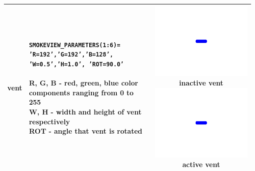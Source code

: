 \begin{longtable}[ht]{|l|l|c|}
vent&
\parbox[c]{\boxwidth}{
{\tt SMOKEVIEW\_PARAMETERS(1:6)=}\\
{\tt 'R=192','G=192','B=128',}\\
{\tt 'W=0.5','H=1.0', 'ROT=90.0'}\\ \\
R, G, B - red, green, blue color components ranging from 0 to 255\\
W, H - width and height of vent respectively\\
ROT - angle that vent is rotated
} &
\parbox[c]{\devicewidth}{
\vspace{0.01in}
\includegraphics[width=\devicewidth]{SCRIPT_FIGURES/vent1}
inactive vent\\
\vspace{0.01in}
\includegraphics[width=\devicewidth]{SCRIPT_FIGURES/vent2}
active vent\\
\vspace{0.01in}
}
\\ \hline
\end{longtable}

